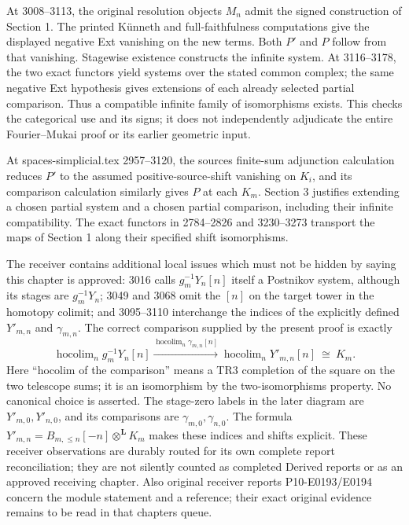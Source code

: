 \documentclass[11pt]{article}
\begin{document}
At 3008–\allowbreak{}3113,\allowbreak{} the original resolution objects \(M_n\) admit the signed construction of Section 1. The printed Künneth and full-faithfulness computations give the displayed negative Ext vanishing on the new terms. Both \(P'\) and \(P\) follow from that vanishing. Stagewise existence constructs the infinite system. At 3116–\allowbreak{}3178,\allowbreak{} the two exact functors yield systems over the stated common complex; the same negative Ext hypothesis gives extensions of each already selected partial comparison. Thus a compatible infinite family of isomorphisms exists. This checks the categorical use and its signs; it does not independently adjudicate the entire Fourier–\allowbreak{}Mukai proof or its earlier geometric input.

At spaces-simplicial.tex 2957–\allowbreak{}3120,\allowbreak{} the source\textquotesingle s finite-sum adjunction calculation reduces \(P'\) to the assumed positive-source-shift vanishing on \(K_i\),\allowbreak{} and its comparison calculation similarly gives \(P\) at each \(K_m\). Section 3 justifies extending a chosen partial system and a chosen partial comparison,\allowbreak{} including their infinite compatibility. The exact functors in 2784–\allowbreak{}2826 and 3230–\allowbreak{}3273 transport the maps of Section 1 along their specified shift isomorphisms.

The receiver contains additional local issues which must not be hidden by saying this chapter is approved:\allowbreak{} 3016 calls \(g_m^{-1}Y_n[n]\) itself a Postnikov system,\allowbreak{} although its stages are \(g_m^{-1}Y_n\); 3049 and 3068 omit the \([n]\) on the target tower in the homotopy colimit; and 3095–\allowbreak{}3110 interchange the indices of the explicitly defined \(Y'_{m,n}\) and \(\gamma_{m,n}\). The correct comparison supplied by the present proof is exactly \[
\operatorname{hocolim}_n g_m^{-1}Y_n[n]
 \xrightarrow{\operatorname{hocolim}_n\gamma_{m,n}[n]}
\operatorname{hocolim}_n Y'_{m,n}[n]\ \cong\ K_m. \tag{7.1}
\] Here ``hocolim of the comparison'' means a TR3 completion of the square on the two telescope sums; it is an isomorphism by the two-isomorphisms property. No canonical choice is asserted. The stage-zero labels in the later diagram are \(Y'_{m,0},Y'_{n,0}\),\allowbreak{} and its comparisons are \(\gamma_{m,0},\gamma_{n,0}\). The formula \(Y'_{m,n}=B_{m,\leq n}[-n]\otimes^{\mathbf L}K_m\) makes these indices and shifts explicit. These receiver observations are durably routed for its own complete report reconciliation; they are not silently counted as completed Derived reports or as an approved receiving chapter. Also original receiver reports P10-E0193/\allowbreak{}E0194 concern the module statement and a reference; their exact original evidence remains to be read in that chapter\textquotesingle s queue.
\end{document}
